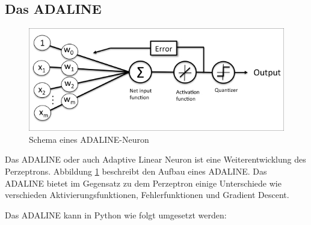 \documentclass[conference, german]{IEEEtran}
\begin{document}
\subsection{Das ADALINE}

 


\begin{figure}[H]
	\includegraphics[width=\linewidth]{img/adaline.png}
	\caption{Schema eines ADALINE-Neuron \citep{ML_PYTHON}}
	\label{fig:ada}
\end{figure}

Das ADALINE oder auch Adaptive Linear Neuron ist eine Weiterentwicklung des Perzeptrons. Abbildung \ref{fig:ada} beschreibt den Aufbau eines ADALINE. 
Das ADALINE bietet im Gegensatz zu dem Perzeptron einige Unterschiede wie verschieden Aktivierungsfunktionen, Fehlerfunktionen und Gradient Descent.

Das ADALINE kann in Python wie folgt umgesetzt werden:



\end{document}
